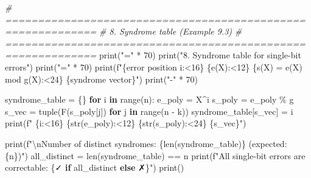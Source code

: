 \documentclass[
]{article}
\newenvironment{Shaded}{}{}
\newcommand{\BuiltInTok}[1]{\textcolor[rgb]{0.00,0.50,0.00}{#1}}
\newcommand{\CharTok}[1]{\textcolor[rgb]{0.25,0.44,0.63}{#1}}
\newcommand{\CommentTok}[1]{\textcolor[rgb]{0.38,0.63,0.69}{\textit{#1}}}
\newcommand{\ControlFlowTok}[1]{\textcolor[rgb]{0.00,0.44,0.13}{\textbf{#1}}}
\newcommand{\DecValTok}[1]{\textcolor[rgb]{0.25,0.63,0.44}{#1}}
\newcommand{\KeywordTok}[1]{\textcolor[rgb]{0.00,0.44,0.13}{\textbf{#1}}}
\newcommand{\NormalTok}[1]{#1}
\newcommand{\OperatorTok}[1]{\textcolor[rgb]{0.40,0.40,0.40}{#1}}
\newcommand{\SpecialCharTok}[1]{\textcolor[rgb]{0.25,0.44,0.63}{#1}}
\newcommand{\SpecialStringTok}[1]{\textcolor[rgb]{0.73,0.40,0.53}{#1}}
\newcommand{\StringTok}[1]{\textcolor[rgb]{0.25,0.44,0.63}{#1}}
\begin{document}
\begin{Shaded}
\begin{Highlighting}[]
\CommentTok{\# ============================================================}
\CommentTok{\# 8. Syndrome table (Example 9.3)}
\CommentTok{\# ============================================================}
\BuiltInTok{print}\NormalTok{(}\StringTok{"="} \OperatorTok{*} \DecValTok{70}\NormalTok{)}
\BuiltInTok{print}\NormalTok{(}\StringTok{"8. Syndrome table for single{-}bit errors"}\NormalTok{)}
\BuiltInTok{print}\NormalTok{(}\StringTok{"="} \OperatorTok{*} \DecValTok{70}\NormalTok{)}
\BuiltInTok{print}\NormalTok{(}\SpecialStringTok{f"}\SpecialCharTok{\{}\StringTok{\textquotesingle{}error position i\textquotesingle{}}\SpecialCharTok{:\textless{}16\}}\SpecialStringTok{ }\SpecialCharTok{\{}\StringTok{\textquotesingle{}e(X)\textquotesingle{}}\SpecialCharTok{:\textless{}12\}}\SpecialStringTok{ }\SpecialCharTok{\{}\StringTok{\textquotesingle{}s(X) = e(X) mod g(X)\textquotesingle{}}\SpecialCharTok{:\textless{}24\}}\SpecialStringTok{ }\SpecialCharTok{\{}\StringTok{\textquotesingle{}syndrome vector\textquotesingle{}}\SpecialCharTok{\}}\SpecialStringTok{"}\NormalTok{)}
\BuiltInTok{print}\NormalTok{(}\StringTok{"{-}"} \OperatorTok{*} \DecValTok{70}\NormalTok{)}

\NormalTok{syndrome\_table }\OperatorTok{=}\NormalTok{ \{\}}
\ControlFlowTok{for}\NormalTok{ i }\KeywordTok{in} \BuiltInTok{range}\NormalTok{(n):}
\NormalTok{    e\_poly }\OperatorTok{=}\NormalTok{ X}\OperatorTok{\^{}}\NormalTok{i}
\NormalTok{    s\_poly }\OperatorTok{=}\NormalTok{ e\_poly }\OperatorTok{\%}\NormalTok{ g}
\NormalTok{    s\_vec }\OperatorTok{=} \BuiltInTok{tuple}\NormalTok{(F(s\_poly[j]) }\ControlFlowTok{for}\NormalTok{ j }\KeywordTok{in} \BuiltInTok{range}\NormalTok{(n }\OperatorTok{{-}}\NormalTok{ k))}
\NormalTok{    syndrome\_table[s\_vec] }\OperatorTok{=}\NormalTok{ i}
    \BuiltInTok{print}\NormalTok{(}\SpecialStringTok{f"  }\SpecialCharTok{\{}\NormalTok{i}\SpecialCharTok{:\textless{}16\}}\SpecialStringTok{ }\SpecialCharTok{\{}\BuiltInTok{str}\NormalTok{(e\_poly)}\SpecialCharTok{:\textless{}12\}}\SpecialStringTok{ }\SpecialCharTok{\{}\BuiltInTok{str}\NormalTok{(s\_poly)}\SpecialCharTok{:\textless{}24\}}\SpecialStringTok{ }\SpecialCharTok{\{}\NormalTok{s\_vec}\SpecialCharTok{\}}\SpecialStringTok{"}\NormalTok{)}

\BuiltInTok{print}\NormalTok{(}\SpecialStringTok{f"}\CharTok{\textbackslash{}n}\SpecialStringTok{Number of distinct syndromes: }\SpecialCharTok{\{}\BuiltInTok{len}\NormalTok{(syndrome\_table)}\SpecialCharTok{\}}\SpecialStringTok{ (expected: }\SpecialCharTok{\{}\NormalTok{n}\SpecialCharTok{\}}\SpecialStringTok{)"}\NormalTok{)}
\NormalTok{all\_distinct }\OperatorTok{=} \BuiltInTok{len}\NormalTok{(syndrome\_table) }\OperatorTok{==}\NormalTok{ n}
\BuiltInTok{print}\NormalTok{(}\SpecialStringTok{f"All single{-}bit errors are correctable: }\SpecialCharTok{\{}\StringTok{\textquotesingle{}✓\textquotesingle{}} \ControlFlowTok{if}\NormalTok{ all\_distinct }\ControlFlowTok{else} \StringTok{\textquotesingle{}✗\textquotesingle{}}\SpecialCharTok{\}}\SpecialStringTok{"}\NormalTok{)}
\BuiltInTok{print}\NormalTok{()}


\end{Highlighting}
\end{Shaded}
\end{document}

